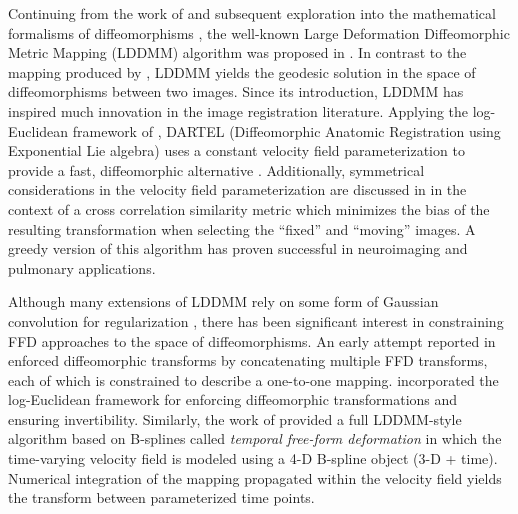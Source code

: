 \documentclass{frontiersSCNS}
\begin{document}
Continuing from the work of \cite{christensen1996} and subsequent exploration into the mathematical formalisms of diffeomorphisms \citep[e.g.][]{dupuis1998},
the well-known Large Deformation Diffeomorphic Metric Mapping (LDDMM) algorithm
was proposed in \cite{beg2005}.  In contrast to the mapping produced
by \cite{christensen1996}, LDDMM yields the geodesic solution in the space of diffeomorphisms between two images. Since its introduction, LDDMM has
inspired much innovation in the image registration literature.  Applying
the log-Euclidean framework of \cite{arsigny2006}, DARTEL (Diffeomorphic Anatomic Registration using Exponential Lie algebra) uses a constant velocity field parameterization to provide a fast, diffeomorphic alternative \citep{ashburner2007}. Additionally, symmetrical considerations in the velocity field parameterization are discussed in \cite{avants2008} in the context of a cross correlation similarity metric which minimizes the bias of the resulting transformation when selecting the ``fixed'' and ``moving'' images.  A greedy version of this algorithm has proven successful in neuroimaging \citep{klein2009} and pulmonary \citep{murphy2011} applications.





Although many extensions of LDDMM rely
on some form of Gaussian convolution for
regularization \citep[e.g.][]{risser2011}, there has been significant interest in constraining
FFD approaches to the space of diffeomorphisms.
An early attempt reported in \cite{rueckert2006} enforced
diffeomorphic transforms
by concatenating multiple FFD transforms, each of which is constrained
to describe a one-to-one mapping.
\cite{modat2011} incorporated the log-Euclidean
framework for enforcing diffeomorphic transformations and ensuring invertibility.  Similarly, the work of \cite{de-craene2011} provided
a full LDDMM-style algorithm based on B-splines called
{\em temporal free-form deformation} in which the
time-varying velocity field
is modeled using a 4-D B-spline object (3-D + time).  Numerical integration of the mapping propagated within the velocity field yields the transform between parameterized time points.
\end{document}
